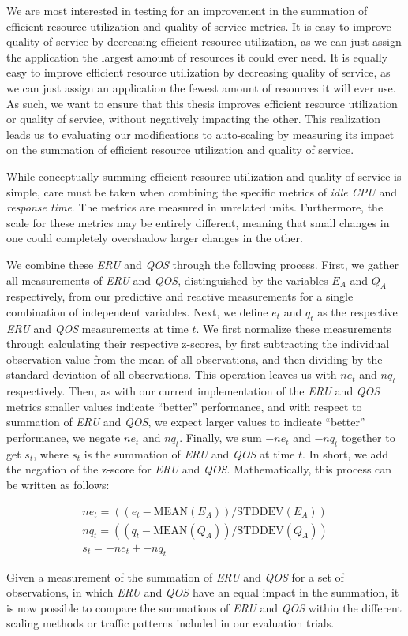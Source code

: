 We are most interested in testing for an improvement in the summation of
efficient resource utilization and quality of service metrics. It is
easy to improve quality of service by decreasing efficient resource
utilization, as we can just assign the application the largest amount of
resources it could ever need. It is equally easy to improve efficient resource
utilization by decreasing quality of service, as we can just assign an
application the fewest amount of resources it will ever use. As such, we want to
ensure that this thesis improves efficient resource utilization or quality of
service, without negatively impacting the other. This realization leads us to
evaluating our modifications to auto-scaling by measuring its impact on the
summation of efficient resource utilization and quality of service.

While conceptually summing efficient resource utilization and quality of service
is simple, care must be taken when combining the specific metrics of
\textit{idle CPU} and \textit{response time}. The metrics are measured in unrelated
units. Furthermore, the scale for these metrics may be entirely different,
meaning that small changes in one could completely overshadow larger changes in
the other.

We combine these \textit{ERU} and \textit{QOS} through the following process.
First, we gather all measurements of \textit{ERU} and \textit{QOS},
distinguished by the variables $E_{A}$ and $Q_{A}$ respectively, from our
predictive and reactive measurements for a single combination of independent
variables. Next, we define $e_{t}$ and $q_{t}$ as the
respective \textit{ERU} and \textit{QOS} measurements at time $t$. We first
normalize these measurements through calculating their respective z-scores,
by first subtracting the individual observation value
from the mean of all observations, and then dividing by the standard deviation of all
observations. This operation leaves us with $ne_{t}$ and $nq_{t}$ respectively.
Then, as with our current implementation of the \textit{ERU} and \textit{QOS}
metrics smaller values indicate ``better'' performance, and with respect to
summation of \textit{ERU} and \textit{QOS}, we expect larger values to indicate
``better'' performance, we negate $ne_{t}$ and $nq_{t}$. Finally, we sum
$-ne_{t}$ and $-nq_{t}$ together to get $s_{t}$, where $s_{t}$ is the summation
of \textit{ERU} and \textit{QOS} at time $t$.
In short, we add the negation of the z-score for
\textit{ERU} and \textit{QOS}. Mathematically, this process can be written as
follows:

\begin{align*}
  ne_{t} = ((e_{t} - \mbox{MEAN}(E_{A})) / \mbox{STDDEV}(E_{A})) \\
  nq_{t} = ((q_{t} - \mbox{MEAN}(Q_{A})) / \mbox{STDDEV}(Q_{A})) \\
  s_{t} = -ne_{t} + -nq_{t}
\end{align*}

Given a measurement of the summation of \textit{ERU} and \textit{QOS} for a set
of observations, in which \textit{ERU} and \textit{QOS} have an equal impact in
the summation, it is now possible to compare the summations of \textit{ERU} and
\textit{QOS} within the different scaling methods or traffic patterns included
in our evaluation trials.
